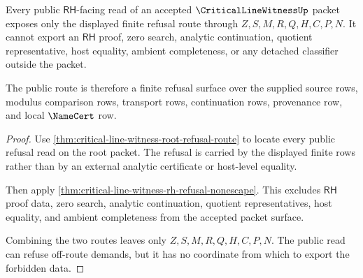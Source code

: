 \begin{theorem}
\label{thm:critical-line-witness-rh-refusal-public-nonescape}
Every public $\mathsf{RH}$-facing read of an accepted $\CriticalLineWitnessUp$ packet exposes only the displayed finite refusal route through $Z,S,M,R,Q,H,C,P,N$. It cannot export an $\mathsf{RH}$ proof, zero search, analytic continuation, quotient representative, host equality, ambient completeness, or any detached classifier outside the packet.

The public route is therefore a finite refusal surface over the supplied source rows, modulus comparison rows, transport rows, continuation rows, provenance row, and local $\NameCert$ row.
\end{theorem}
\begin{proof}
Use \autoref{thm:critical-line-witness-root-refusal-route} to locate every public refusal read on the root packet. The refusal is carried by the displayed finite rows rather than by an external analytic certificate or host-level equality.

Then apply \autoref{thm:critical-line-witness-rh-refusal-nonescape}. This excludes $\mathsf{RH}$ proof data, zero search, analytic continuation, quotient representatives, host equality, and ambient completeness from the accepted packet surface.

Combining the two routes leaves only $Z,S,M,R,Q,H,C,P,N$. The public read can refuse off-route demands, but it has no coordinate from which to export the forbidden data.
\end{proof}
